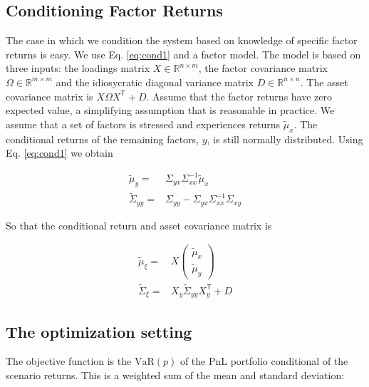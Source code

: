 \documentclass[letter, 12pt]{article}
\newcommand{\transpose}{^\mathsf{T}}
\newcommand{\R}{\mathbb{R}}
\newcommand{\inv}{^{-1}}
\begin{document}
\subsection{Conditioning Factor Returns}
The case in which we condition the system based on knowledge of specific factor returns is easy. We use Eq. \ref{eq:cond1} and a factor model. The model is based on three inputs: the loadings matrix $X\in\R^{n\times m}$, the factor covariance matrix $\Omega\in\R^{m\times m}$ and the idiosycratic diagonal variance matrix $D\in\R^{n\times n}$. The asset covariance matrix is $X\Omega X\transpose + D$. Assume that the factor returns have zero expected value, a simplifying assumption that is reasonable in practice. We assume that a set of factors is stressed and experiences returns $\tilde \mu_x$. The conditional returns of the remaining factors, $y$, is still normally distributed. Using Eq. \ref{eq:cond1} we obtain

\begin{align*}
\tilde\mu_y=& \Sigma_{yx} \Sigma_{xx}\inv \tilde \mu_x \\
\tilde\Sigma_{yy} =& \Sigma_{yy} - \Sigma_{yx} \Sigma_{xx}\inv \Sigma_{xy}
\end{align*}

So that the conditional return and asset covariance matrix is

\begin{align*}
\tilde\mu_\xi = & X \left(
\begin{array}{c}
\tilde\mu_x\\
\tilde\mu_y
\end{array}
\right) \\
\tilde\Sigma_\xi = & X_y \tilde\Sigma_{yy} X_y\transpose + D
\end{align*}
%
%
%
\subsection{The optimization setting}
The objective function is the $\text{VaR}(p)$ of the  PnL portfolio conditional of the scenario returns. This is a weighted sum of the mean and standard deviation:
\end{document}
